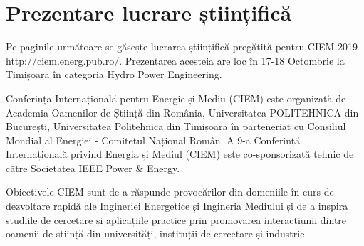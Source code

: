

\clearpage


\section{Prezentare lucrare științifică}

Pe paginile următoare se găsește lucrarea științifică pregătită pentru CIEM 2019 http://ciem.energ.pub.ro/. Prezentarea acesteia are loc în 17-18 Octombrie la Timișoara în categoria Hydro Power Engineering.

Conferința Internațională pentru Energie și Mediu (CIEM) este organizată de Academia Oamenilor de Știință din România, Universitatea POLITEHNICA din București, Universitatea Politehnica din Timișoara în parteneriat cu Consiliul Mondial al Energiei - Comitetul Național Român. A 9-a Conferință Internațională privind Energia și Mediul (CIEM) este co-sponsorizată tehnic de către Societatea IEEE Power & Energy.

Obiectivele CIEM sunt de a răspunde provocărilor din domeniile în curs de dezvoltare rapidă ale Ingineriei Energetice și Ingineria Mediului și de a inspira studiile de cercetare și aplicațiile practice prin promovarea interacțiunii dintre oamenii de știință din universități, instituții de cercetare și industrie.



\clearpage